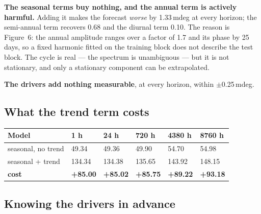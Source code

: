 \documentclass[11pt,a4paper]{article}
\begin{document}
\textbf{The seasonal terms buy nothing, and the annual term is actively
harmful.} Adding it makes the forecast \emph{worse} by 1.33\,mdeg at every
horizon; the semi-annual term recovers 0.68 and the diurnal term 0.10. The reason
is Figure~6: the annual amplitude ranges over a factor of 1.7 and its phase by 25
days, so a fixed harmonic fitted on the training block does not describe the test
block. The cycle is real --- the spectrum is unambiguous --- but it is not
stationary, and only a stationary component can be extrapolated.

\textbf{The drivers add nothing measurable}, at every horizon, within
$\pm$0.25\,mdeg.

\subsection{What the trend term costs}

\begin{center}
\small
\begin{tabular}{lR{1.6cm}R{1.6cm}R{1.6cm}R{1.6cm}R{1.6cm}}
\toprule
\textbf{Model} & \textbf{1 h} & \textbf{24 h} & \textbf{720 h} &
\textbf{4380 h} & \textbf{8760 h} \\
\midrule
seasonal, no trend & 49.34 & 49.36 & 49.90 & 54.70 & 54.98 \\
seasonal + trend   & 134.34 & 134.38 & 135.65 & 143.92 & 148.15 \\
\midrule
\textbf{cost}      & \textbf{+85.00} & \textbf{+85.02} & \textbf{+85.75} &
\textbf{+89.22} & \textbf{+93.18} \\
\bottomrule
\end{tabular}
\end{center}


\subsection{Knowing the drivers in advance}
\end{document}
